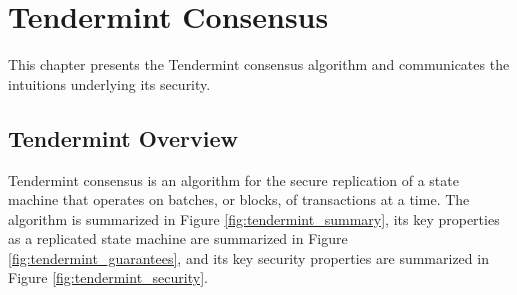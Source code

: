 \chapter{Tendermint Consensus}
\label{ch:tendermint}

This chapter presents the Tendermint consensus algorithm and communicates the intuitions underlying its security.

\section{Tendermint Overview}

Tendermint consensus is an algorithm for the secure replication of a state
machine that operates on batches, or blocks, of transactions at a time.
The algorithm is summarized in Figure \ref{fig:tendermint_summary}, 
its key properties as a replicated state machine are summarized in Figure \ref{fig:tendermint_guarantees}, 
and its key security properties are summarized in Figure \ref{fig:tendermint_security}.

